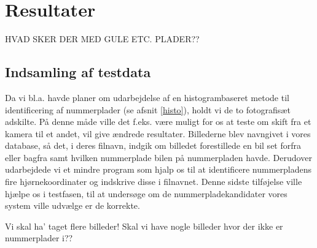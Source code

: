\section{Resultater}

HVAD SKER DER MED GULE ETC. PLADER??
\subsection{Indsamling af testdata}







Da vi bl.a. havde planer om udarbejdelse af en histogrambaseret metode til identificering af nummerplader (se afsnit \ref{histo}), holdt vi de to fotografisæt adskilte. På denne måde ville det f.eks. være muligt for os at teste om skift fra et kamera til et andet, vil give ændrede resultater. Billederne blev navngivet i vores database, så det, i deres filnavn, indgik om billedet forestillede en bil set forfra eller bagfra samt hvilken nummerplade bilen på nummerpladen havde. Derudover udarbejdede vi et mindre program som hjalp os til at identificere nummerpladens fire hjørnekoordinater og indskrive disse i filnavnet. Denne sidste tilføjelse ville hjælpe os i testfasen, til at undersøge om de nummerpladekandidater vores system ville udvælge er de korrekte.
 
Vi skal ha' taget flere billeder! Skal vi have nogle billeder hvor der ikke er nummerplader i??




